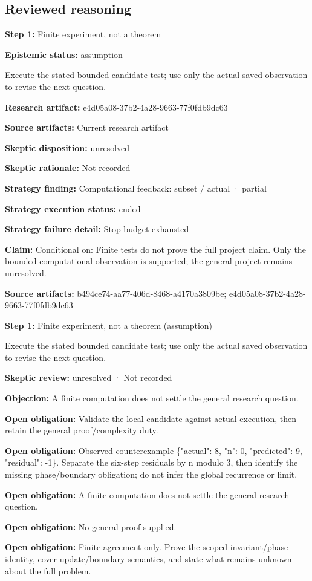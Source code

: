 \documentclass[11pt]{article}
\begin{document}
\subsection{Reviewed reasoning}
\textbf{Step 1:} Finite experiment, not a theorem\par
\textbf{Epistemic status:} assumption\par
Execute the stated bounded candidate test; use only the actual saved observation to revise the next question.\par
\textbf{Research artifact:} e4d05a08-37b2-4a28-9663-77f0fdb9dc63\par
\textbf{Source artifacts:} Current research artifact\par
\textbf{Skeptic disposition:} unresolved\par
\textbf{Skeptic rationale:} Not recorded\par
\textbf{Strategy finding:} Computational feedback: subset / actual · partial\par
\textbf{Strategy execution status:} ended\par
\textbf{Strategy failure detail:} Stop budget exhausted\par
\textbf{Claim:} Conditional on: Finite tests do not prove the full project claim. Only the bounded computational observation is supported; the general project remains unresolved.\par
\textbf{Source artifacts:} b494ce74-aa77-406d-8468-a4170a3809be; e4d05a08-37b2-4a28-9663-77f0fdb9dc63\par
\textbf{Step 1:} Finite experiment, not a theorem (assumption)\par
Execute the stated bounded candidate test; use only the actual saved observation to revise the next question.\par
\textbf{Skeptic review:} unresolved · Not recorded\par
\textbf{Objection:} A finite computation does not settle the general research question.\par
\textbf{Open obligation:} Validate the local candidate against actual execution, then retain the general proof/complexity duty.\par
\textbf{Open obligation:} Observed counterexample \{"actual": 8, "n": 0, "predicted": 9, "residual": -1\}. Separate the six-step residuals by n modulo 3, then identify the missing phase/boundary obligation; do not infer the global recurrence or limit.\par
\textbf{Open obligation:} A finite computation does not settle the general research question.\par
\textbf{Open obligation:} No general proof supplied.\par
\textbf{Open obligation:} Finite agreement only. Prove the scoped invariant/phase identity, cover update/boundary semantics, and state what remains unknown about the full problem.\par
\end{document}
